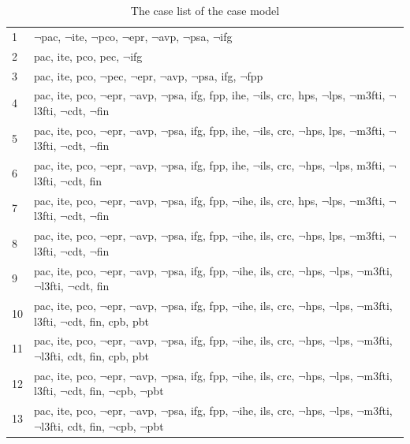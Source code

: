 \documentclass{IOS-Book-Article}
\begin{document}
\footnotesize
\begin{longtable}{p{5mm}p{115mm}}
\caption{The case list of the case model\label{tab:long}}\\
\hline
1	& $\neg$pac, $\neg$ite, $\neg$pco, $\neg$epr, $\neg$avp, $\neg$psa, $\neg$ifg \\
2	& pac, ite, pco, pec, $\neg$ifg \\
3	& pac, ite, pco, $\neg$pec, $\neg$epr, $\neg$avp, $\neg$psa, ifg, $\neg$fpp \\
4	& pac, ite, pco, $\neg$epr, $\neg$avp, $\neg$psa, ifg, fpp, ihe, $\neg$ils, crc, hps, $\neg$lps, $\neg$m3fti, $\neg$l3fti, $\neg$cdt, $\neg$fin \\
5	& pac, ite, pco, $\neg$epr, $\neg$avp, $\neg$psa, ifg, fpp, ihe, $\neg$ils, crc, $\neg$hps, lps, $\neg$m3fti, $\neg$l3fti, $\neg$cdt, $\neg$fin \\
6	& pac, ite, pco, $\neg$epr, $\neg$avp, $\neg$psa, ifg, fpp, ihe, $\neg$ils, crc, $\neg$hps, $\neg$lps, m3fti, $\neg$l3fti, $\neg$cdt, fin \\
7	& pac, ite, pco, $\neg$epr, $\neg$avp, $\neg$psa, ifg, fpp, $\neg$ihe, ils, crc, hps, $\neg$lps, $\neg$m3fti, $\neg$l3fti, $\neg$cdt, $\neg$fin \\
8	& pac, ite, pco, $\neg$epr, $\neg$avp, $\neg$psa, ifg, fpp, $\neg$ihe, ils, crc, $\neg$hps, lps, $\neg$m3fti, $\neg$l3fti, $\neg$cdt, $\neg$fin \\
9	& pac, ite, pco, $\neg$epr, $\neg$avp, $\neg$psa, ifg, fpp, $\neg$ihe, ils, crc, $\neg$hps, $\neg$lps, $\neg$m3fti, $\neg$l3fti, $\neg$cdt, fin \\
10	& pac, ite, pco, $\neg$epr, $\neg$avp, $\neg$psa, ifg, fpp, $\neg$ihe, ils, crc, $\neg$hps, $\neg$lps, $\neg$m3fti, l3fti, $\neg$cdt, fin, cpb, pbt \\
11	& pac, ite, pco, $\neg$epr, $\neg$avp, $\neg$psa, ifg, fpp, $\neg$ihe, ils, crc, $\neg$hps, $\neg$lps, $\neg$m3fti, $\neg$l3fti, cdt, fin, cpb, pbt \\
12	& pac, ite, pco, $\neg$epr, $\neg$avp, $\neg$psa, ifg, fpp, $\neg$ihe, ils, crc, $\neg$hps, $\neg$lps, $\neg$m3fti, l3fti, $\neg$cdt, fin, $\neg$cpb, $\neg$pbt \\
13	& pac, ite, pco, $\neg$epr, $\neg$avp, $\neg$psa, ifg, fpp, $\neg$ihe, ils, crc, $\neg$hps, $\neg$lps, $\neg$m3fti, $\neg$l3fti, cdt, fin, $\neg$cpb, $\neg$pbt \\

\end{longtable}
\end{document}
